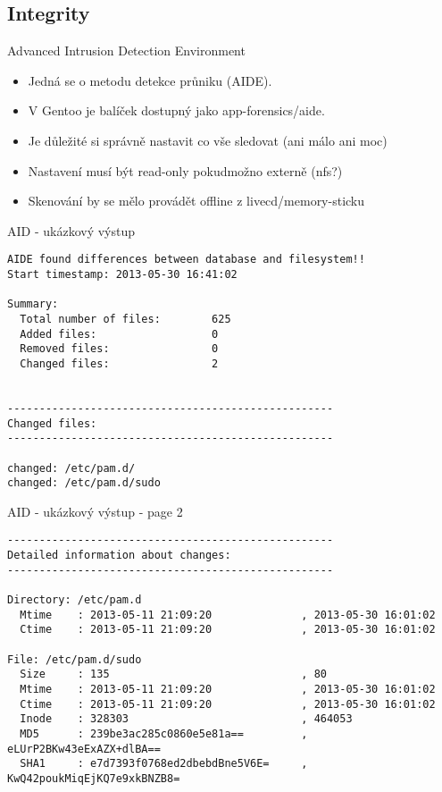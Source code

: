 \documentclass{beamer}
\begin{document}
\subsection{Integrity}

\begin{frame}{Advanced Intrusion Detection Environment}
	\begin{itemize}
		\item Jedná se o metodu detekce průniku (AIDE).
		\item V Gentoo je balíček dostupný jako app-forensics/aide.
		\item Je důležité si správně nastavit co vše sledovat (ani málo ani moc)
		\item Nastavení musí být read-only pokudmožno externě (nfs?)
		\item Skenování by se mělo provádět offline z livecd/memory-sticku
	\end{itemize}
\end{frame}

\begin{frame}[fragile]{AID - ukázkový výstup}
	\begin{tiny}
	\begin{verbatim}
AIDE found differences between database and filesystem!!
Start timestamp: 2013-05-30 16:41:02

Summary:
  Total number of files:        625
  Added files:                  0
  Removed files:                0
  Changed files:                2


---------------------------------------------------
Changed files:
---------------------------------------------------

changed: /etc/pam.d/
changed: /etc/pam.d/sudo
	\end{verbatim}
	\end{tiny}
\end{frame}


\begin{frame}[fragile]{AID - ukázkový výstup - page 2}
	\begin{tiny}
	\begin{verbatim}
---------------------------------------------------
Detailed information about changes:
---------------------------------------------------

Directory: /etc/pam.d
  Mtime    : 2013-05-11 21:09:20              , 2013-05-30 16:01:02
  Ctime    : 2013-05-11 21:09:20              , 2013-05-30 16:01:02

File: /etc/pam.d/sudo
  Size     : 135                              , 80
  Mtime    : 2013-05-11 21:09:20              , 2013-05-30 16:01:02
  Ctime    : 2013-05-11 21:09:20              , 2013-05-30 16:01:02
  Inode    : 328303                           , 464053
  MD5      : 239be3ac285c0860e5e81a==         , eLUrP2BKw43eExAZX+dlBA==
  SHA1     : e7d7393f0768ed2dbebdBne5V6E=     , KwQ42poukMiqEjKQ7e9xkBNZB8=
	\end{verbatim}
	\end{tiny}
\end{frame}
\end{document}
